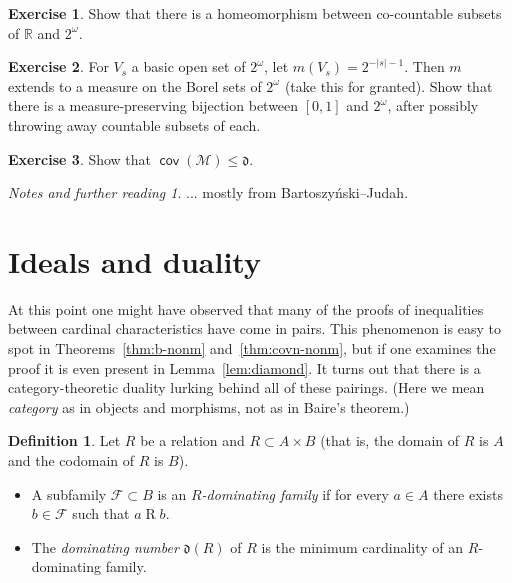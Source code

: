 \documentclass[11pt,oneside]{amsbook}
\newcommand{\R}{\mathbb R}
\newcommand{\Meager}{\mathcal M}
\DeclareMathOperator{\cov}{\mathsf{cov}}
\theoremstyle{definition}
\newtheorem{exerc}{Exercise}[section]
\theoremstyle{plain}
\theoremstyle{definition}
\newtheorem{definition}[theorem]{Definition}
\theoremstyle{remark}
\newtheorem*{notes}{Notes and further reading}
\numberwithin{equation}{section}
\numberwithin{figure}{section}
\begin{document}
\begin{exerc}
  \label{exerc:meager-bij}
  Show that there is a homeomorphism between co-countable subsets of $\R$ and $2^\omega$.
\end{exerc}

\begin{exerc}
  \label{exerc:null-bij}
  For $V_s$ a basic open set of $2^\omega$, let $m(V_s)=2^{-|s|-1}$. Then $m$ extends to a measure on the Borel sets of $2^\omega$ (take this for granted). Show that there is a measure-preserving bijection between $[0,1]$ and $2^\omega$, after possibly throwing away countable subsets of each.
\end{exerc}

\begin{exerc}
  \label{exerc:covm-d}
  Show that $\cov(\Meager)\leq\mathfrak d$.
\end{exerc}

\begin{notes}
  ... mostly from Bartoszy\'nski--Judah.
\end{notes}


\newpage
\section{Ideals and duality}

At this point one might have observed that many of the proofs of inequalities between cardinal characteristics have come in pairs. This phenomenon is easy to spot in Theorems~\ref{thm:b-nonm} and~\ref{thm:covn-nonm}, but if one examines the proof it is even present in Lemma~\ref{lem:diamond}. It turns out that there is a category-theoretic duality lurking behind all of these pairings. (Here we mean \emph{category} as in objects and morphisms, not as in Baire's theorem.)

\begin{definition}
  Let $R$ be a relation and $R\subset A\times B$ (that is, the domain of $R$ is $A$ and the codomain of $R$ is $B$).
  \begin{itemize}
  \item A subfamily $\mathcal F\subset B$ is an \emph{$R$-dominating family} if for every $a\in A$ there exists $b\in\mathcal F$ such that $a\mathrel{R}b$.
  \item The \emph{dominating number} $\mathfrak d(R)$ of $R$ is the minimum cardinality of an $R$-dominating family.
  \end{itemize}
\end{definition}
\end{document}
